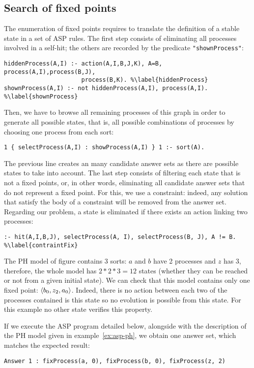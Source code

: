 \subsection{Search of fixed points}

The enumeration of fixed points requires to translate the definition of a stable state
in a set of ASP rules.
The first step consists of eliminating all processes involved in a self-hit;
the others are recorded by the predicate \texttt{"shownProcess"}:
\begin{lstlisting}
hiddenProcess(A,I) :- action(A,I,B,J,K), A=B, process(A,I),process(B,J),
                      process(B,K). %\label{hiddenProcess}
shownProcess(A,I) :- not hiddenProcess(A,I), process(A,I). %\label{shownProcess}
\end{lstlisting}
Then, we have to browse all remaining processes of this graph
in order to generate all possible states,
that is, all possible combinations of processes by choosing one process from each sort:
\begin{lstlisting}
1 { selectProcess(A,I) : showProcess(A,I) } 1 :- sort(A).
\end{lstlisting}
The previous line creates an many candidate answer sets as there are possible states
to take into account.
The last step consists of filtering each state that is not a fixed points,
or, in other words, eliminating all candidate answer sets that do not
represent a fixed point.
For this, we use a constraint:
indeed, any solution that satisfy the body of a constraint will be removed from the answer set.
Regarding our problem, a state is eliminated if there exists an action linking two processes:
\begin{lstlisting}
:- hit(A,I,B,J), selectProcess(A, I), selectProcess(B, J), A != B. %\label{contraintFix}
\end{lstlisting}

\begin{example}
The PH model of figure  contains 3 sorts:
$a$ and $b$ have 2 processes and $z$ has 3, therefore, the whole model has $2*2*3 = 12$ states (whether they can be reached or not from a given initial state).
We can check that this model contains only one fixed point: $\langle b_0, z_2, a_0 \rangle$.
Indeed, there is no action between each two of the processes contained is this state so no evolution is possible from this state. 
For this example no other state verifies this property.

If we execute the ASP program detailed below,
alongside with the description of the PH model given in example~\ref{ex:asp-ph},
we obtain one answer set, which matches the expected result:
\begin{lstlisting}[numbers=none]
Answer 1 : fixProcess(a, 0), fixProcess(b, 0), fixProcess(z, 2)
\end{lstlisting}
\end{example}